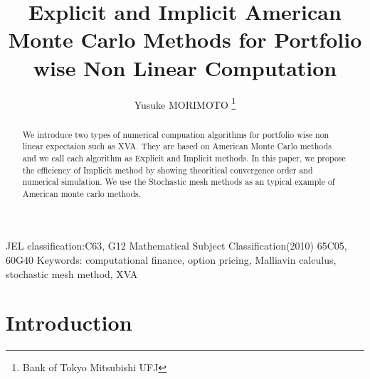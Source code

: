 \documentclass[12pt]{article}
\begin{document}
\title{Explicit and Implicit American Monte Carlo Methods 
for Portfolio wise Non Linear Computation}

\author{
Yusuke MORIMOTO
\thanks{
Bank of Tokyo Mitsubishi UFJ }
}
\date{}

\maketitle
\begin{abstract}
We introduce two types of numerical compuation algorithms for portfolio wise non linear 
expectaion such as XVA. They are based on American Monte Carlo methods and we call each algorithm as Explicit and Implicit methods.
In this paper, we propose the efficiency
of Implicit method by showing theoritical convergence order and numerical simulation. 
We use the Stochastic mesh methods as an typical example of American monte carlo methods.
\end{abstract}

JEL classification:C63, G12
Mathematical Subject Classification(2010)   65C05,  60G40
Keywords:  computational finance, option pricing, Malliavin calculus,
stochastic mesh method, XVA

\section{Introduction}
\end{document}
